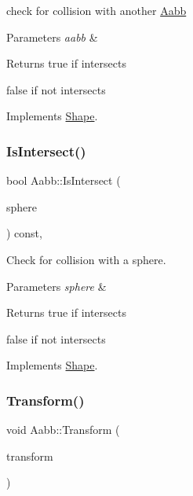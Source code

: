 check for collision with another \hyperlink{classAabb}{Aabb} 


\begin{DoxyParams}{Parameters}
{\em aabb} & \\
\hline
\end{DoxyParams}
\begin{DoxyReturn}{Returns}
true if intersects 

false if not intersects 
\end{DoxyReturn}


Implements \hyperlink{classShape_a1bfc3d6c995c4326d4691b22d16d2f12}{Shape}.

\mbox{\label{classAabb_af08568647c234b68334892b20885084a}} 
\subsubsection{\texorpdfstring{Is\+Intersect()}{IsIntersect()}\hspace{0.1cm}{\footnotesize\ttfamily [2/2]}}
{\footnotesize\ttfamily bool Aabb\+::\+Is\+Intersect (\begin{DoxyParamCaption}\item[{const \hyperlink{classSphere}{Sphere} \&}]{sphere }\end{DoxyParamCaption}) const\hspace{0.3cm}{\ttfamily [override]}, {\ttfamily [virtual]}}



Check for collision with a sphere. 


\begin{DoxyParams}{Parameters}
{\em sphere} & \\
\hline
\end{DoxyParams}
\begin{DoxyReturn}{Returns}
true if intersects 

false if not intersects 
\end{DoxyReturn}


Implements \hyperlink{classShape_a1c942dca54e0d81f685624f33f2ce6c8}{Shape}.

\mbox{\label{classAabb_ace74b981085cccf12e3ff8e8640a0e07}} 
\subsubsection{\texorpdfstring{Transform()}{Transform()}}
{\footnotesize\ttfamily void Aabb\+::\+Transform (\begin{DoxyParamCaption}\item[{const Matrix \&}]{transform }\end{DoxyParamCaption})}



